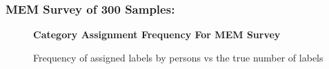 \documentclass[runningheads,a4paper]{llncs}
\begin{document}
\begin{appendices}
\subsubsection{MEM Survey of 300 Samples:}

\begin{figure}[htpb]
    \begin{center}
    \textbf{Category Assignment Frequency For MEM Survey}
    \end{center}
    \caption{Frequency of assigned labels by persons vs the true number of labels}
\label{fig:freq-survey-2p}
\end{figure} 


\end{appendices}
\end{document}
